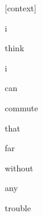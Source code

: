 \documentclass[varwidth]{standalone}
\begin{document}
\begin{CJK*}{UTF8}{gbsn}
{\setlength{\fboxsep}{0pt}\colorbox{white!0}{\parbox{0.9\textwidth}{
\colorbox{red!2.8629921871470287e-05}{\strut [context]} \colorbox{red!0.006724418140947819}{\strut i} \colorbox{red!0.009441331028938293}{\strut think} \colorbox{red!0.007932675071060658}{\strut i} \colorbox{red!0.006106913555413485}{\strut can} \colorbox{red!99.2918930053711}{\strut commute} \colorbox{red!0.5144224166870117}{\strut that} \colorbox{red!0.02867177315056324}{\strut far} \colorbox{red!0.04714110866189003}{\strut without} \colorbox{red!0.08608219027519226}{\strut any} \colorbox{red!0.0015476769767701626}{\strut trouble} 
}}}
\end{CJK*}
\end{document}
